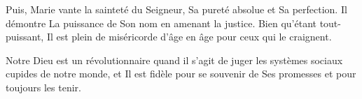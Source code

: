 Puis, Marie vante la sainteté du Seigneur, Sa pureté absolue et Sa perfection. Il démontre La puissance de Son nom en amenant la justice. Bien qu'étant tout-puissant, Il est plein de miséricorde \og d'âge en âge pour ceux qui le craignent. \fg{}

Notre Dieu est un révolutionnaire quand il s'agit de juger les systèmes sociaux cupides de notre monde, et Il est fidèle pour se souvenir de Ses promesses et pour toujours les tenir.

\enlargethispage{5\baselineskip}


